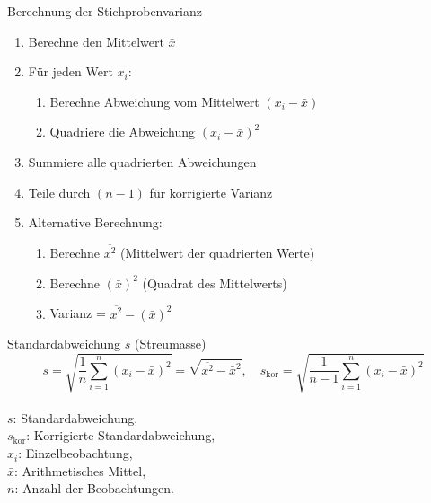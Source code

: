 \begin{KR}{Berechnung der Stichprobenvarianz}
\begin{enumerate}
    \item Berechne den Mittelwert $\bar{x}$
    \item Für jeden Wert $x_i$:
        \begin{enumerate}
            \item Berechne Abweichung vom Mittelwert $(x_i - \bar{x})$
            \item Quadriere die Abweichung $(x_i - \bar{x})^2$
        \end{enumerate}
    \item Summiere alle quadrierten Abweichungen
    \item Teile durch $(n-1)$ für korrigierte Varianz
    \item Alternative Berechnung:
        \begin{enumerate}
            \item Berechne $\overline{x^2}$ (Mittelwert der quadrierten Werte)
            \item Berechne $(\bar{x})^2$ (Quadrat des Mittelwerts)
            \item Varianz = $\overline{x^2} - (\bar{x})^2$
        \end{enumerate}
\end{enumerate}
\end{KR}

\begin{definition}{Standardabweichung $s$ (Streumasse)}\\
$$
s=\sqrt{\frac{1}{n} \sum_{i=1}^{n}\left(x_{i}-\bar{x}\right)^{2}}=\sqrt{\overline{x^{2}}-\bar{x}^{2}}, \quad s_{\text{kor}}=\sqrt{\frac{1}{n-1} \sum_{i=1}^{n}\left(x_{i}-\bar{x}\right)^{2}}
$$
\\
$s$: Standardabweichung, \\
$s_{\text{kor}}$: Korrigierte Standardabweichung, \\
$x_{i}$: Einzelbeobachtung, \\
$\bar{x}$: Arithmetisches Mittel, \\
$n$: Anzahl der Beobachtungen.
\end{definition}

